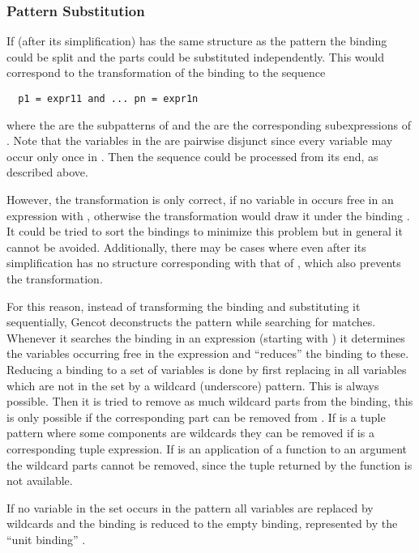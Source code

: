 \subsubsection{Pattern Substitution}

If (after its simplification)  has the same structure as the pattern  the binding could be split and 
the parts could be substituted independently. This would correspond to the transformation of the binding 
to the sequence 
\begin{verbatim}
  p1 = expr11 and ... pn = expr1n
\end{verbatim}
where the  are the subpatterns of  and the  are the corresponding subexpressions of .
Note that the variables in the  are pairwise disjunct since every variable may occur only once in .
Then the sequence could be processed from its end, as described above.

However, the transformation is only correct, if no variable in  occurs free in an expression  with 
, otherwise the transformation would draw it under the binding . It could be tried to sort
the bindings to minimize this problem but in general it cannot be avoided. Additionally, there may be cases where 
even after its simplification has no structure corresponding with that of , which also prevents the transformation.

For this reason, instead of transforming the binding and substituting it sequentially, Gencot deconstructs the pattern while
searching for matches. Whenever it searches the binding  in an expression (starting with ) 
it determines the variables occurring free in the expression and ``reduces'' the binding to these. Reducing a binding to
a set of variables is done by first replacing in  all variables which are not in the set by a wildcard (underscore) 
pattern. This is always possible. Then it is tried to remove as much wildcard parts from the binding, this is only possible if
the corresponding part can be removed from . If  is a tuple pattern where some components are wildcards
they can be removed if  is a corresponding tuple expression. If  is an application of a function to
an argument the wildcard parts cannot be removed, since the tuple returned by the function is not available.

If no variable in the set occurs in the pattern all variables are replaced by wildcards and the binding is reduced to the 
empty binding, represented by the ``unit binding'' \code{() = ()}.

